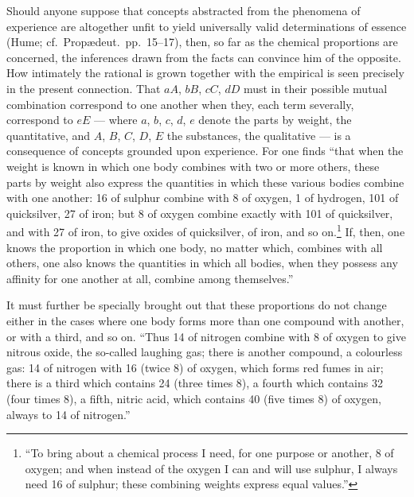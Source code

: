 \documentclass[12pt,a4paper]{book}
\begin{document}
Should anyone suppose that concepts abstracted from the phenomena of experience
are altogether unfit to yield universally valid determinations of essence
(Hume; cf.\ Propædeut.\ pp.~15--17), then, so far as the chemical proportions
are concerned, the inferences drawn from the facts can convince him of the
opposite. How intimately the rational is grown together with the empirical is
seen precisely in the present connection. That $aA$, $bB$, $cC$, $dD$ must in
their possible mutual combination correspond to one another when they, each
term severally, correspond to $eE$ --- where $a$, $b$, $c$, $d$, $e$ denote the
parts by weight, the quantitative, and $A$, $B$, $C$, $D$, $E$ the substances,
the qualitative --- is a consequence of concepts grounded upon experience. For
one finds ``that when the weight is known in which one body combines with two
or more others, these parts by weight also express the quantities in which
these various bodies combine with one another: 16 of sulphur combine with 8 of
oxygen, 1 of hydrogen, 101 of quicksilver, 27 of iron; but 8 of oxygen combine
exactly with 101 of quicksilver, and with 27 of iron, to give oxides of
quicksilver, of iron, and so on.\footnote{``To bring about a chemical process I
need, for one purpose or another, 8 of oxygen; and when instead of the oxygen I
can and will use sulphur, I always need 16 of sulphur; these combining weights
express equal values.''}
If, then, one knows the proportion in which one body, no matter which, combines
with all others,
one also knows the quantities in which all bodies, when they possess any
affinity for one another at all, combine among themselves.''

It must further be specially brought out that these proportions do not change
either in the cases where one body forms more than one compound with another,
or with a third, and so on. ``Thus 14 of nitrogen combine with 8 of oxygen to
give nitrous oxide, the so-called laughing gas; there is another compound, a
colourless gas: 14 of nitrogen with 16 (twice 8) of oxygen, which forms red
fumes in air; there is a third which contains 24 (three times 8), a fourth
which contains 32 (four times 8), a fifth, nitric acid, which contains 40 (five
times 8) of oxygen, always to 14 of nitrogen.''
\end{document}
